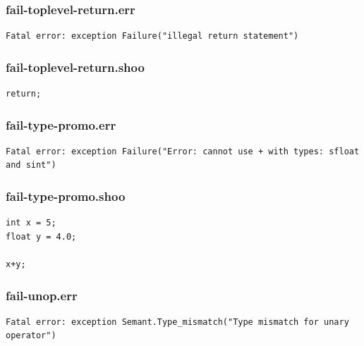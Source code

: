 \documentclass[12pt]{article}
\begin{document}
\subsubsection{fail-toplevel-return.err}
\begin{mdframed}[hidealllines=true,backgroundcolor=green!10]
\begin{lstlisting}
Fatal error: exception Failure("illegal return statement")
\end{lstlisting}
\end{mdframed}
\subsubsection{fail-toplevel-return.shoo}
\begin{mdframed}[hidealllines=true,backgroundcolor=blue!10]
\begin{lstlisting}
return;\end{lstlisting}
\end{mdframed}
\subsubsection{fail-type-promo.err}
\begin{mdframed}[hidealllines=true,backgroundcolor=green!10]
\begin{lstlisting}
Fatal error: exception Failure("Error: cannot use + with types: sfloat and sint")\end{lstlisting}
\end{mdframed}
\subsubsection{fail-type-promo.shoo}
\begin{mdframed}[hidealllines=true,backgroundcolor=blue!10]
\begin{lstlisting}
int x = 5;
float y = 4.0;

x+y;\end{lstlisting}
\end{mdframed}
\subsubsection{fail-unop.err}
\begin{mdframed}[hidealllines=true,backgroundcolor=green!10]
\begin{lstlisting}
Fatal error: exception Semant.Type_mismatch("Type mismatch for unary operator")\end{lstlisting}
\end{mdframed}
\end{document}
